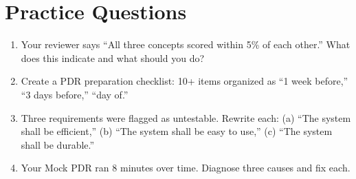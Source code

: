 \section{Practice Questions}
\begin{enumerate}[leftmargin=1.5em]
\item Your reviewer says ``All three concepts scored within 5\% of each other.'' What does this indicate and what should you do?
\item Create a PDR preparation checklist: 10+ items organized as ``1 week before,'' ``3 days before,'' ``day of.''
\item Three requirements were flagged as untestable. Rewrite each: (a) ``The system shall be efficient,'' (b) ``The system shall be easy to use,'' (c) ``The system shall be durable.''
\item Your Mock PDR ran 8 minutes over time. Diagnose three causes and fix each.
\end{enumerate}


